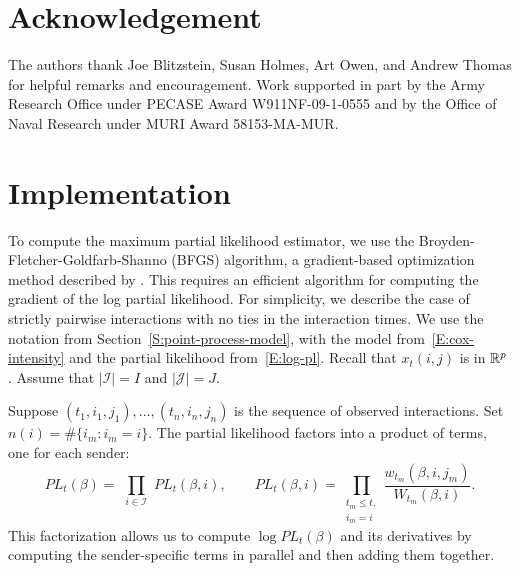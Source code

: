 \documentclass[final]{statsoc}
\begin{document}
\section*{Acknowledgement}

The authors thank Joe Blitzstein, Susan Holmes, Art Owen, and Andrew Thomas
for helpful remarks and encouragement.
Work supported in part by the Army Research Office under
PECASE Award W911NF-09-1-0555 and by the Office of Naval
Research under MURI Award 58153-MA-MUR.


\appendix

\section{Implementation}\label{S:implementation}

To compute the maximum partial likelihood estimator, we use the
Broyden-Fletcher-Goldfarb-Shanno (BFGS) algorithm, a gradient-based
optimization method described by
\citet{nocedal2006numerical}.  This requires an efficient algorithm for
computing the gradient of the log partial likelihood.  For simplicity, we
describe the case of strictly pairwise interactions with no ties in the
interaction times.  We use the notation from
Section~\ref{S:point-process-model}, with
the model from~\eqref{E:cox-intensity} and the partial likelihood
from~\eqref{E:log-pl}.  Recall that $x_t(i,j)$ is in $\mathbb{R}^p$.
Assume that $|\mathcal{I}| = I$ and $|\mathcal{J}| = J$.

Suppose $(t_1, i_1, j_1), \ldots, (t_n, i_n, j_n)$ is the sequence of observed
interactions.  Set $n(i) = \#\{ i_m : i_m = i \}.$
The partial likelihood factors into a product of terms, one for each sender:
\begin{equation*}
    \mathit{PL}_t(\beta)
        =
        \,\,
        \prod_{i \in \mathcal{I}}
            \,\,
            \mathit{PL}_t(\beta, i),
    \qquad
    \mathit{PL}_t(\beta, i)
        =
        \!\!\!\!
        \prod_{\substack{t_m \leq t, \\ i_m = i}}
            \!\!\!
            \frac{w_{t_m} (\beta, i, j_m)}
                 {W_{t_m}(\beta, i)}.
\end{equation*}
This factorization allows us to compute $\log \mathit{PL}_t(\beta)$ and
its derivatives by computing the sender-specific terms in parallel and
then adding them together.
\end{document}

